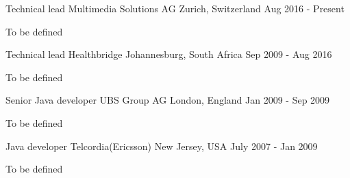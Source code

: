

\begin{cventries}
  \cventry
    {Technical lead} %
    {Multimedia Solutions AG} %
    {Zurich, Switzerland} %
    {Aug 2016 - Present} %
    {
      \begin{cvitems} %
        \item {To be defined}
      \end{cvitems}
    }

  \cventry
    {Technical lead} %
    {Healthbridge} %
    {Johannesburg, South Africa} %
    {Sep 2009 - Aug 2016} %
    {
      \begin{cvitems} %
        \item {To be defined}
      \end{cvitems}
    }

  \cventry
    {Senior Java developer} %
    {UBS Group AG} %
    {London, England} %
    {Jan 2009 - Sep 2009} %
    {
      \begin{cvitems} %
        \item {To be defined}
      \end{cvitems}
    }

  \cventry
    {Java developer} %
    {Telcordia(Ericsson)} %
    {New Jersey, USA} %
    {July 2007 - Jan 2009} %
    {
      \begin{cvitems} %
        \item {To be defined}
      \end{cvitems}
    }


\end{cventries}
